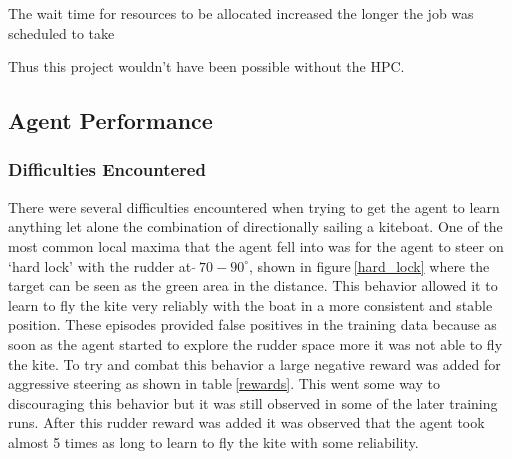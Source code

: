 The wait time for resources to be allocated increased the longer the job was scheduled to take 


Thus this project wouldn't have been possible without the HPC.



\subsection{Agent Performance}

\subsubsection*{Difficulties Encountered}
There were several difficulties encountered when trying to get the agent to learn anything let alone the combination of directionally sailing a kiteboat. One of the most common local maxima that the agent fell into was for the agent to steer on `hard lock' with the rudder at \textit{$\tilde{} ~70-90^{\circ}$}, shown in figure$~$\ref{hard_lock} where the target can be seen as the green area in the distance. This behavior allowed it to learn to fly the kite very reliably with the boat in a more consistent and stable position. These episodes provided false positives in the training data because as soon as the agent started to explore the rudder space more it was not able to fly the kite. To try and combat this behavior a large negative reward was added for aggressive steering as shown in table$~$\ref{rewards}. This went some way to discouraging this behavior but it was still observed in some of the later training runs. After this rudder reward was added it was observed that the agent took almost 5 times as long to learn to fly the kite with some reliability. 

